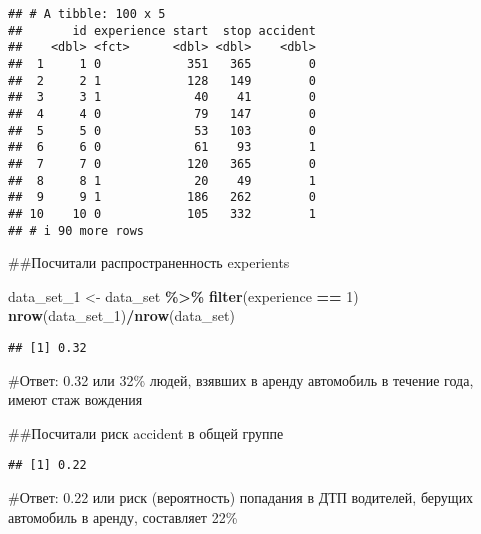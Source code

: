 \documentclass[
]{article}
\newenvironment{Shaded}{\begin{snugshade}}{\end{snugshade}}
\newcommand{\FunctionTok}[1]{\textcolor[rgb]{0.13,0.29,0.53}{\textbf{#1}}}
\newcommand{\NormalTok}[1]{#1}
\newcommand{\OtherTok}[1]{\textcolor[rgb]{0.56,0.35,0.01}{#1}}
\newcommand{\SpecialCharTok}[1]{\textcolor[rgb]{0.81,0.36,0.00}{\textbf{#1}}}
\newcommand{\StringTok}[1]{\textcolor[rgb]{0.31,0.60,0.02}{#1}}
\begin{document}
\begin{verbatim}
## # A tibble: 100 x 5
##       id experience start  stop accident
##    <dbl> <fct>      <dbl> <dbl>    <dbl>
##  1     1 0            351   365        0
##  2     2 1            128   149        0
##  3     3 1             40    41        0
##  4     4 0             79   147        0
##  5     5 0             53   103        0
##  6     6 0             61    93        1
##  7     7 0            120   365        0
##  8     8 1             20    49        1
##  9     9 1            186   262        0
## 10    10 0            105   332        1
## # i 90 more rows
\end{verbatim}

\#\#Посчитали распространенность experients

\begin{Shaded}
\begin{Highlighting}[]
\NormalTok{data\_set\_1 }\OtherTok{\textless{}{-}}\NormalTok{ data\_set }\SpecialCharTok{\%\textgreater{}\%}
  \FunctionTok{filter}\NormalTok{(experience }\SpecialCharTok{==} \StringTok{\textquotesingle{}1\textquotesingle{}}\NormalTok{)}
\FunctionTok{nrow}\NormalTok{(data\_set\_1)}\SpecialCharTok{/}\FunctionTok{nrow}\NormalTok{(data\_set) }
\end{Highlighting}
\end{Shaded}

\begin{verbatim}
## [1] 0.32
\end{verbatim}

\#Ответ: 0.32 или 32\% людей, взявших в аренду автомобиль в течение
года, имеют стаж вождения

\#\#Посчитали риск accident в общей группе

\begin{Shaded}
\end{Shaded}

\begin{verbatim}
## [1] 0.22
\end{verbatim}

\#Ответ: 0.22 или риск (вероятность) попадания в ДТП водителей, берущих
автомобиль в аренду, составляет 22\%
\end{document}
